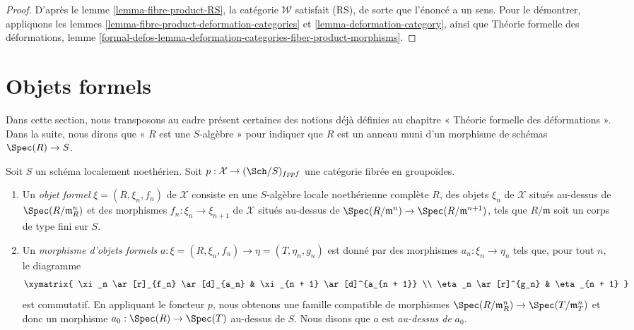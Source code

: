 \begin{proof}
D'après le lemme \ref{lemma-fibre-product-RS}, la catégorie $\mathcal{W}$
satisfait (RS), de sorte que l'énoncé a un sens. Pour le démontrer, appliquons
les lemmes \ref{lemma-fibre-product-deformation-categories} et
\ref{lemma-deformation-category}, ainsi que Théorie formelle des déformations,
lemme \ref{formal-defos-lemma-deformation-categories-fiber-product-morphisms}.
\end{proof}






\section{Objets formels}
\label{section-formal-objects}

\noindent
Dans cette section, nous transposons au cadre présent certaines des notions
déjà définies au chapitre « Théorie formelle des déformations ».
Dans la suite, nous dirons que « $R$ est une $S$-algèbre » pour indiquer
que $R$ est un anneau muni d'un morphisme de schémas $\Spec(R) \to S$.

\begin{definition}
\label{definition-formal-objects}
Soit $S$ un schéma localement noethérien. Soit
$p : \mathcal{X} \to (\Sch/S)_{fppf}$ une catégorie fibrée en groupoïdes.
\begin{enumerate}
\item Un {\it objet formel} $\xi = (R, \xi_n, f_n)$ de $\mathcal{X}$ consiste
en une $S$-algèbre locale noethérienne complète $R$, des objets $\xi_n$ de
$\mathcal{X}$ situés au-dessus de $\Spec(R/\mathfrak m_R^n)$ et des morphismes
$f_n : \xi_n \to \xi_{n + 1}$ de $\mathcal{X}$ situés au-dessus de
$\Spec(R/\mathfrak m^n) \to \Spec(R/\mathfrak m^{n + 1})$,
tels que $R/\mathfrak m$ soit un corps de type fini sur $S$.
\item Un {\it morphisme d'objets formels}
$a : \xi = (R, \xi_n, f_n) \to \eta = (T, \eta_n, g_n)$
est donné par des morphismes $a_n : \xi_n \to \eta_n$ tels que, pour tout
$n$, le diagramme
$$
\xymatrix{
\xi_n \ar[r]_{f_n} \ar[d]_{a_n} & \xi_{n + 1} \ar[d]^{a_{n + 1}} \\
\eta_n \ar[r]^{g_n} & \eta_{n + 1}
}
$$
est commutatif. En appliquant le foncteur $p$, nous obtenons une famille
compatible de morphismes
$\Spec(R/\mathfrak m_R^n) \to \Spec(T/\mathfrak m_T^n)$ et donc un morphisme
$a_0 : \Spec(R) \to \Spec(T)$ au-dessus de $S$. Nous disons que $a$ est
{\it au-dessus de} $a_0$.
\end{enumerate}
\end{definition}

